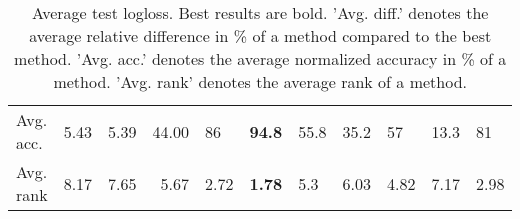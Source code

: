 \begin{table}[ht!]
\begin{tabular}{lllrlllllll}
  Avg. acc. & 5.43 & 5.39 & 44.00 & 86 & \textbf{94.8} & 55.8 & 35.2 & 57 & 13.3 & 81 \\ 
  Avg. rank & 8.17 & 7.65 & 5.67 & 2.72 & \textbf{1.78} & 5.3 & 6.03 & 4.82 & 7.17 & 2.98 \\ 
   \hline
\hline
\end{tabular}
\endgroup
\caption{Average test logloss. 
                  Best results are bold. 
                  'Avg. diff.' denotes the average relative difference in \% of a method compared to the best method.
                  'Avg. acc.' denotes the average normalized accuracy in \% of a method.
                  'Avg. rank' denotes the average rank of a method.} 
\label{TABLES/table_results_logloss}
\end{table}
